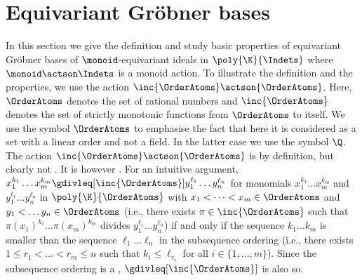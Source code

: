 \section{Equivariant Gr\"{o}bner bases}
%
In this section we give the definition and study basic properties of equivariant Gr\"{o}bner bases of $\monoid$-equivariant ideals in $\poly{\K}{\Indets}$ where $\monoid\actson\Indets$ is a  monoid action.
To illustrate the definition and the properties,
we use the action $\inc{\OrderAtoms}\actson{\OrderAtoms}$.
Here, $\OrderAtoms$ denotes the set of rational numbers and $\inc{\OrderAtoms}$ denotes the set of strictly monotonic functions from $\OrderAtoms$ to itself.
We use the symbol $\OrderAtoms$ to emphasise the fact that here it is considered as a set with a linear order and not a field.
In the latter case we use the symbol $\Q$.
The action $\inc{\OrderAtoms}\actson{\OrderAtoms}$ is  by definition,
but clearly not .
It is however .
For an intuitive argument,
$x^{k_1}_1\dots x^{k_m}_m\gdivleq[\inc{\OrderAtoms}]y^{\ell_1}_1\dots y^{\ell_n}_n$ for monomials $x^{k_1}_1\dots x^{k_m}_m$ and $y^{\ell_1}_1\dots y^{\ell_n}_n$ in $\poly{\K}{\OrderAtoms}$ with $x_1 < \dots < x_m \in\OrderAtoms$ and $y_1 < \dots y_n \in\OrderAtoms$
(i.e., there exists $\pi\in\inc{\OrderAtoms}$ such that $\pi(x_1)^{k_1}\dots \pi(x_m)^{k_m}$ divides $y^{\ell_1}_1\dots y^{\ell_n}_n$)
if and only if the sequence $k_1\dots k_m$ is smaller than the sequence $\ell_1\dots \ell_n$ in the subsequence ordering (i.e., there exists $1 \leq r_1 < \dots < r_m \leq n$ such that $k_i \leq \ell_{r_i}$ for all $i\in\{1,\dots,m\}$).
Since the subsequence ordering is a ,
$\gdivleq[\inc{\OrderAtoms}]$ is also so.


